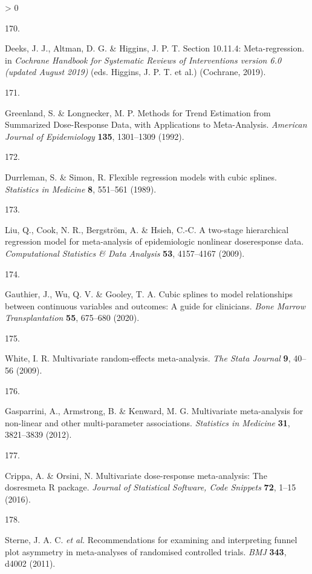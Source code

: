 \documentclass[a4paper, twoside]{templates/ociamthesis}
\newlength{\cslhangindent}
\newlength{\csllabelwidth}
\newenvironment{CSLReferences}[3] %
 {%
  \setlength{\parindent}{0pt}
  \ifodd #1 \everypar{\setlength{\hangindent}{\cslhangindent}}\ignorespaces\fi
  \ifnum #2 > 0
  \setlength{\parskip}{#2\baselineskip}
  \fi
 }%
 {}
\newcommand{\CSLLeftMargin}[1]{\parbox[t]{\maxof{\widthof{#1}}{\csllabelwidth}}{#1}}
\newcommand{\CSLRightInline}[1]{\parbox[t]{\linewidth - \csllabelwidth}{#1}}
\begin{document}
\begin{CSLReferences}{0}{0}
\leavevmode\hypertarget{ref-deeks2019}{}%
\CSLLeftMargin{170. }
\CSLRightInline{Deeks, J. J., Altman, D. G. \& Higgins, J. P. T. Section 10.11.4: Meta-regression. in \emph{Cochrane {Handbook} for {Systematic Reviews} of {Interventions} version 6.0 (updated {August} 2019)} (eds. Higgins, J. P. T. et al.) ({Cochrane}, 2019).}

\leavevmode\hypertarget{ref-greenland1992}{}%
\CSLLeftMargin{171. }
\CSLRightInline{Greenland, S. \& Longnecker, M. P. Methods for {Trend Estimation} from {Summarized Dose}-{Response Data}, with {Applications} to {Meta}-{Analysis}. \emph{American Journal of Epidemiology} \textbf{135}, 1301--1309 (1992).}

\leavevmode\hypertarget{ref-durrleman1989}{}%
\CSLLeftMargin{172. }
\CSLRightInline{Durrleman, S. \& Simon, R. Flexible regression models with cubic splines. \emph{Statistics in Medicine} \textbf{8}, 551--561 (1989).}

\leavevmode\hypertarget{ref-liu2009}{}%
\CSLLeftMargin{173. }
\CSLRightInline{Liu, Q., Cook, N. R., Bergström, A. \& Hsieh, C.-C. A two-stage hierarchical regression model for meta-analysis of epidemiologic nonlinear dose{}response data. \emph{Computational Statistics \& Data Analysis} \textbf{53}, 4157--4167 (2009).}

\leavevmode\hypertarget{ref-gauthier2020}{}%
\CSLLeftMargin{174. }
\CSLRightInline{Gauthier, J., Wu, Q. V. \& Gooley, T. A. Cubic splines to model relationships between continuous variables and outcomes: A guide for clinicians. \emph{Bone Marrow Transplantation} \textbf{55}, 675--680 (2020).}

\leavevmode\hypertarget{ref-white2009}{}%
\CSLLeftMargin{175. }
\CSLRightInline{White, I. R. Multivariate random-effects meta-analysis. \emph{The Stata Journal} \textbf{9}, 40--56 (2009).}

\leavevmode\hypertarget{ref-gasparrini2012}{}%
\CSLLeftMargin{176. }
\CSLRightInline{Gasparrini, A., Armstrong, B. \& Kenward, M. G. Multivariate meta-analysis for non-linear and other multi-parameter associations. \emph{Statistics in Medicine} \textbf{31}, 3821--3839 (2012).}

\leavevmode\hypertarget{ref-crippa2016}{}%
\CSLLeftMargin{177. }
\CSLRightInline{Crippa, A. \& Orsini, N. Multivariate dose-response meta-analysis: The dosresmeta {R} package. \emph{Journal of Statistical Software, Code Snippets} \textbf{72}, 1--15 (2016).}

\leavevmode\hypertarget{ref-sterne2011}{}%
\CSLLeftMargin{178. }
\CSLRightInline{Sterne, J. A. C. \emph{et al.} Recommendations for examining and interpreting funnel plot asymmetry in meta-analyses of randomised controlled trials. \emph{BMJ} \textbf{343}, d4002 (2011).}


\end{CSLReferences}
\end{document}
